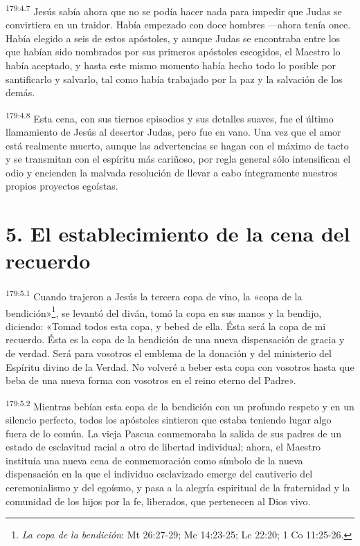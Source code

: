 \par
\textsuperscript{179:4.7} Jesús sabía ahora que no se podía hacer nada para impedir que Judas se convirtiera en un traidor. Había empezado con doce hombres ---ahora tenía once. Había elegido a seis de estos apóstoles, y aunque Judas se encontraba entre los que habían sido nombrados por sus primeros apóstoles escogidos, el Maestro lo había aceptado, y hasta este mismo momento había hecho todo lo posible por santificarlo y salvarlo, tal como había trabajado por la paz y la salvación de los demás.

\par
\textsuperscript{179:4.8} Esta cena, con sus tiernos episodios y sus detalles suaves, fue el último llamamiento de Jesús al desertor Judas, pero fue en vano. Una vez que el amor está realmente muerto, aunque las advertencias se hagan con el máximo de tacto y se transmitan con el espíritu más cariñoso, por regla general sólo intensifican el odio y encienden la malvada resolución de llevar a cabo íntegramente nuestros propios proyectos egoístas.

\section*{5. El establecimiento de la cena del recuerdo}
\par
\textsuperscript{179:5.1} Cuando trajeron a Jesús la tercera copa de vino, la «copa de la bendición»\footnote{\textit{La copa de la bendición}: Mt 26:27-29; Mc 14:23-25; Lc 22:20; 1 Co 11:25-26.}, se levantó del diván, tomó la copa en sus manos y la bendijo, diciendo: «Tomad todos esta copa, y bebed de ella. Ésta será la copa de mi recuerdo. Ésta es la copa de la bendición de una nueva dispensación de gracia y de verdad. Será para vosotros el emblema de la donación y del ministerio del Espíritu divino de la Verdad. No volveré a beber esta copa con vosotros hasta que beba de una nueva forma con vosotros en el reino eterno del Padre».

\par
\textsuperscript{179:5.2} Mientras bebían esta copa de la bendición con un profundo respeto y en un silencio perfecto, todos los apóstoles sintieron que estaba teniendo lugar algo fuera de lo común. La vieja Pascua conmemoraba la salida de sus padres de un estado de esclavitud racial a otro de libertad individual; ahora, el Maestro instituía una nueva cena de conmemoración como símbolo de la nueva dispensación en la que el individuo esclavizado emerge del cautiverio del ceremonialismo y del egoísmo, y pasa a la alegría espiritual de la fraternidad y la comunidad de los hijos por la fe, liberados, que pertenecen al Dios vivo.

